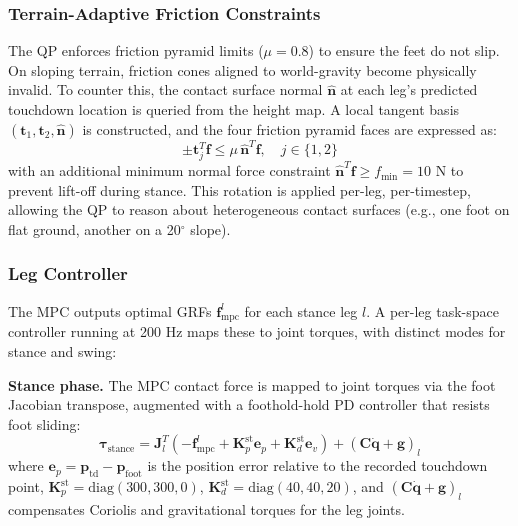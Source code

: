 \documentclass[letterpaper, 10 pt, conference]{ieeeconf}  %
\begin{document}
\subsubsection{Terrain-Adaptive Friction Constraints}
The QP enforces friction pyramid limits ($\mu = 0.8$) to ensure the feet do not slip. On sloping terrain, friction cones aligned to world-gravity become physically invalid. To counter this, the contact surface normal $\hat{\mathbf{n}}$ at each leg's predicted touchdown location is queried from the height map. A local tangent basis $(\mathbf{t}_1, \mathbf{t}_2, \hat{\mathbf{n}})$ is constructed, and the four friction pyramid faces are expressed as:
\begin{equation}
\pm\mathbf{t}_j^T \mathbf{f} \leq \mu\, \hat{\mathbf{n}}^T \mathbf{f}, \quad j \in \{1,2\} \label{eq:friction_cone}
\end{equation}
with an additional minimum normal force constraint $\hat{\mathbf{n}}^T \mathbf{f} \geq f_{\min} = 10$ N to prevent lift-off during stance. This rotation is applied per-leg, per-timestep, allowing the QP to reason about heterogeneous contact surfaces (e.g., one foot on flat ground, another on a 20$^\circ$ slope).

\subsubsection{Leg Controller}
\label{sec:leg_ctrl}
The MPC outputs optimal GRFs $\mathbf{f}^l_{\text{mpc}}$ for each stance leg $l$. A per-leg task-space controller running at 200 Hz maps these to joint torques, with distinct modes for stance and swing:

\textbf{Stance phase.} The MPC contact force is mapped to joint torques via the foot Jacobian transpose, augmented with a foothold-hold PD controller that resists foot sliding:
\begin{equation}
\boldsymbol{\tau}_{\text{stance}} = \mathbf{J}_l^T \left(-\mathbf{f}^l_{\text{mpc}} + \mathbf{K}_p^{\text{st}} \mathbf{e}_{p} + \mathbf{K}_d^{\text{st}} \mathbf{e}_{v}\right) + \left(\mathbf{C}\dot{\mathbf{q}} + \mathbf{g}\right)_l \label{eq:stance_tau}
\end{equation}
where $\mathbf{e}_p = \mathbf{p}_{\text{td}} - \mathbf{p}_{\text{foot}}$ is the position error relative to the recorded touchdown point, $\mathbf{K}_p^{\text{st}} = \text{diag}(300, 300, 0)$, $\mathbf{K}_d^{\text{st}} = \text{diag}(40, 40, 20)$, and $(\mathbf{C}\dot{\mathbf{q}} + \mathbf{g})_l$ compensates Coriolis and gravitational torques for the leg joints.
\end{document}
